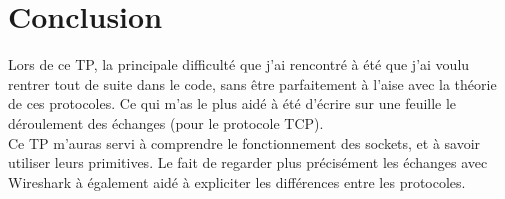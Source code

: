 \documentclass[10pt,a4paper,final]{article}
\begin{document}
\section{Conclusion}


	Lors de ce TP, la principale difficulté que j'ai rencontré à été que j'ai voulu rentrer tout de suite dans le code, sans être parfaitement à l'aise avec la théorie de 
	ces protocoles. Ce qui m'as le plus aidé à été d'écrire sur une feuille le déroulement des échanges (pour le protocole TCP).\\
	Ce TP m'auras servi à comprendre le fonctionnement des sockets, et à savoir utiliser leurs primitives. Le fait de regarder plus précisément les échanges avec Wireshark
	à également aidé à expliciter les différences entre les protocoles.
\end{document}
